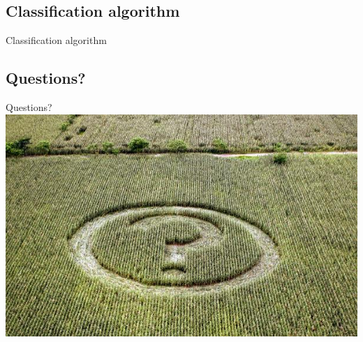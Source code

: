 \documentclass[screen, compress]{beamer}
\begin{document}
\subsection{Classification algorithm}
\begin{frame}{Classification algorithm}
\end{frame}

\subsection{Questions?}
\begin{frame}{Questions?}
\includegraphics[width=\textwidth]{img/any-questions}
\end{frame}
\end{document}
